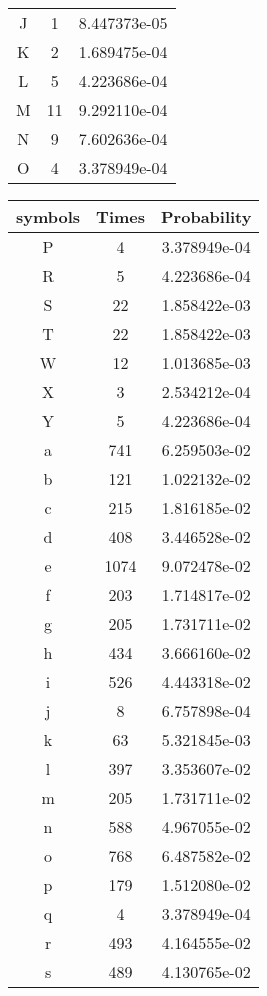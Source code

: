 \documentclass[12pt]{article} %
\numberwithin{equation}{section}
\begin{document}
\begin{table}[!hptb]
\begin{minipage}{.5\linewidth}
\begin{tabular}{ccc}
J 		 &1      &8.447373e-05\\
K 		 &2      &1.689475e-04\\
L 		 &5      &4.223686e-04\\
M 		 &11     &9.292110e-04\\
N 		 &9      &7.602636e-04\\
O 		 &4      &3.378949e-04\\  \hline
\end{tabular}
\end{minipage}\begin{minipage}{.5\linewidth}
\centering
\begin{tabular}{ccc}  %
\hline
symbols  &Times  &Probability \\ \hline
P 		 &4      &3.378949e-04\\
R 		 &5      &4.223686e-04\\
S 		 &22     &1.858422e-03\\
T 		 &22     &1.858422e-03\\
W 		 &12     &1.013685e-03\\
X 		 &3      &2.534212e-04\\
Y 		 &5      &4.223686e-04\\
a 		 &741    &6.259503e-02\\
b 		 &121    &1.022132e-02\\
c 		 &215    &1.816185e-02\\
d 		 &408    &3.446528e-02\\
e 		 &1074   &9.072478e-02\\
f 		 &203    &1.714817e-02\\
g 		 &205    &1.731711e-02\\
h 		 &434    &3.666160e-02\\
i 		 &526    &4.443318e-02\\
j 		 &8      &6.757898e-04\\
k 		 &63     &5.321845e-03\\
l 		 &397    &3.353607e-02\\
m 		 &205    &1.731711e-02\\
n 		 &588    &4.967055e-02\\
o 		 &768    &6.487582e-02\\
p 		 &179    &1.512080e-02\\
q 		 &4      &3.378949e-04\\
r 		 &493    &4.164555e-02\\
s 		 &489    &4.130765e-02\\

\end{tabular}
\end{minipage}
\end{table}
\end{document}

